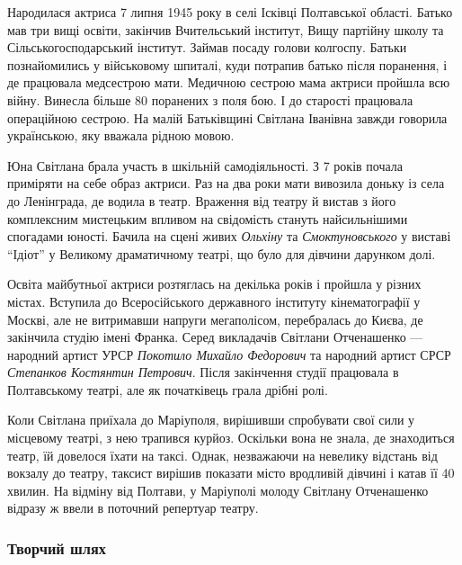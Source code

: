 Народилася актриса 7 липня 1945 року в селі Ісківці Полтавської області. Батько
мав три вищі освіти, закінчив Вчительський інститут, Вищу партійну школу та
Сільськогосподарський інститут. Займав посаду голови колгоспу. Батьки
познайомились у військовому шпиталі, куди потрапив батько після поранення, і де
працювала медсестрою мати. Медичною сестрою мама актриси пройшла всю війну.
Винесла більше 80 поранених з поля бою. І до старості працювала операційною
сестрою. На малій Батьківщині Світлана Іванівна завжди говорила українською,
яку вважала рідною мовою.


Юна Світлана брала участь в шкільній самодіяльності. З 7 років почала приміряти
на себе образ актриси. Раз на два роки мати вивозила доньку із села до
Ленінграда, де водила в театр. Враження від театру й вистав з його комплексним
мистецьким впливом на свідомість стануть найсильнішими спогадами юності. Бачила
на сцені живих \emph{Ольхіну} та \emph{Смоктуновського} у виставі \enquote{Ідіот} у Великому
драматичному театрі, що було для дівчини дарунком долі.

Освіта майбутньої актриси розтяглась на декілька років і пройшла у різних
містах. Вступила до Всеросійського державного інституту кінематографії у
Москві, але не витримавши напруги мегаполісом, перебралась до Києва, де
закінчила студію імені Франка. Серед викладачів Світлани Отченашенко — народний
артист УРСР \emph{Покотило Михайло Федорович} та народний артист СРСР \emph{Степанков
Костянтин Петрович}. Після закінчення студії працювала в Полтавському театрі,
але як початківець грала дрібні ролі.


Коли Світлана приїхала до Маріуполя, вирішивши спробувати свої сили у місцевому
театрі, з нею трапився курйоз. Оскільки вона не знала, де знаходиться театр, їй
довелося їхати на таксі. Однак, незважаючи на невелику відстань від вокзалу до
театру, таксист вирішив показати місто вродливій дівчині і катав її 40 хвилин.
На відміну від Полтави, у Маріуполі молоду Світлану Отченашенко відразу ж ввели
в поточний репертуар театру.

\subsubsection{Творчий шлях}

